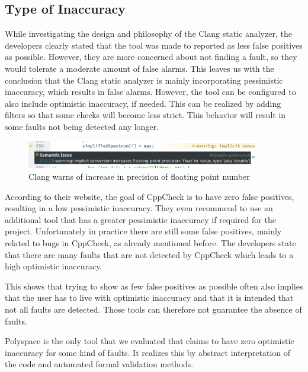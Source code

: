 \documentclass{scrreprt}
\begin{document}
\subsection{Type of Inaccuracy}


While investigating the design and philosophy of the Clang static analyzer, the developers clearly stated that the tool was made to reported as less false positives as possible. However, they are more concerned about not finding a fault, so they would tolerate a moderate amount of false alarms. This leaves us with the conclusion that the Clang static analyzer is mainly incorporating pessimistic inaccuracy, which results in false alarms. However, the tool can be configured to also include optimistic inaccuracy, if needed. This can be realized by adding filters so that some checks will become less strict. This behavior will result in some faults not being detected any longer.

\begin{figure}[h]
	\centering
	\includegraphics[width=0.9\textwidth]{img/clang_fp_implicit_precision_increase}
	\caption[Clang warns of increase in precision]{Clang warns of increase in precision of floating point number}
	\label{fig:clang_fp_implicit_precision_increase}
\end{figure}

According to their website, the goal of CppCheck is to have zero false positives, resulting in a low pessimistic inaccuracy. They even recommend to use an additional tool that has a greater pessimistic inaccuracy if required for the project. Unfortunately in practice there are still some false positives, mainly related to bugs in CppCheck, as already mentioned before. The developers state that there are many faults that are not detected by CppCheck which leads to a high optimistic inaccuracy.

This shows that trying to show as few false positives as possible often also implies that the user has to live with optimistic inaccuracy and that it is intended that not all faults are detected. Those tools can therefore not guarantee the absence of faults.

Polyspace is the only tool that we evaluated that claims to have zero optimistic inaccuracy for some kind of faults. It realizes this by abstract interpretation of the code and automated formal validation methods.
\end{document}
